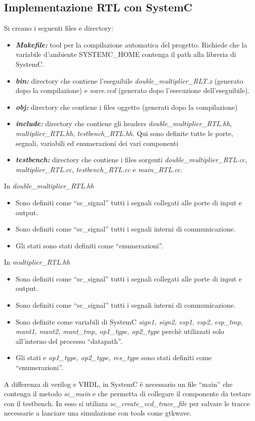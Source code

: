 \documentclass[]{IEEEtran}
\begin{document}
\subsection{Implementazione RTL con SystemC}
Si creano i seguenti files e directory:
\begin{itemize}
\item {\it\bf Makefile:} tool per la compilazione automatica del progetto. Richiede che la variabile d'ambiente SYSTEMC\_HOME contenga il path alla libreria di SystemC.
\item {\it\bf bin:} directory che contiene l'eseguibile {\it double\_multiplier\_RLT.x} (generato dopo la compilazione) e {\it wave.vcd} (generato dopo l'esecuzione dell'eseguibile).
\item {\it\bf obj:} directory che contiene i files oggetto (generati dopo la compilazione)
\item {\it\bf include:} directory che contiene gli headers {\it double\_multiplier\_RTL.hh}, {\it multiplier\_RTL.hh}, {\it testbench\_RTL.hh}. Qui sono definite tutte le porte, segnali, variabili ed enumerazioni dei vari componenti
\item {\it\bf testbench:} directory che contiene i files sorgenti {\it double\_multiplier\_RTL.cc}, {\it multiplier\_RTL.cc}, {\it testbench\_RTL.cc} e {\it main\_RTL.cc}.
\end{itemize}
In {\it double\_multiplier\_RTL.hh}
\begin{itemize}
\item Sono definiti come ``sc\_signal'' tutti i segnali collegati alle porte di input e output.
\item Sono definiti come ``sc\_signal'' tutti i segnali interni di communicazione.
\item Gli stati sono stati definiti come ``enumerazioni''.
\end{itemize}
In {\it multiplier\_RTL.hh}
\begin{itemize}
\item Sono definiti come ``sc\_signal'' tutti i segnali collegati alle porte di input e output.
\item Sono definiti come ``sc\_signal'' tutti i segnali interni di communicazione.
\item Sono definite come variabili di SystemC {\it sign1, sign2, esp1, esp2, esp\_tmp, mant1, mant2, mant\_tmp, op1\_type, op2\_type} perchè utilizzati solo all'interno del processo ``datapath''.
\item Gli stati e {\it op1\_type, op2\_type, res\_type} sono stati definiti come ``enumerazioni''.
\end{itemize}
A differenza di verilog e VHDL, in SystemC è necessario un file ``main'' che contenga il metodo {\it sc\_main} e che permetta di collegare il componente da testare con il testbench. In esso si utilizza {\it sc\_create\_vcd\_trace\_file} per salvare le tracce necessarie a lanciare una simulazione con tools come gtkwave.
\end{document}
